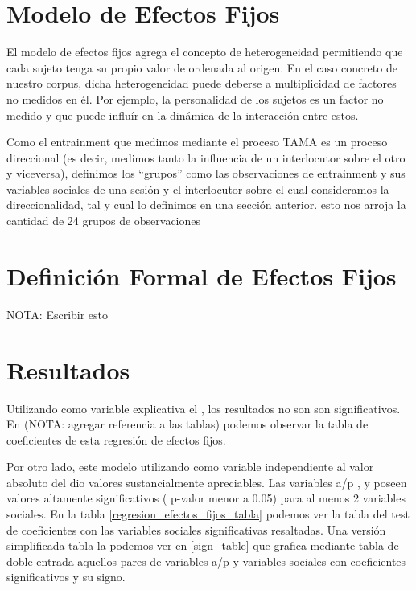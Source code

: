 \section{Modelo de Efectos Fijos}


\newcommand{\slopeestim}[1] { $\estslope \sim #1$ }

El modelo de efectos fijos agrega el concepto de heterogeneidad permitiendo que cada sujeto tenga su propio valor de ordenada al origen. En el caso concreto de nuestro corpus, dicha heterogeneidad puede deberse a multiplicidad de factores no medidos en él. Por ejemplo, la personalidad de los sujetos es un factor no medido y que puede influír en la dinámica de la interacción entre estos.

Como el entrainment que medimos mediante el proceso TAMA es un proceso direccional (es decir, medimos tanto la influencia de un interlocutor sobre el otro y viceversa), definimos los ``grupos'' como las observaciones de entrainment y sus variables sociales de una sesión y el interlocutor sobre el cual consideramos la direccionalidad, tal y cual lo definimos en una sección anterior. esto nos arroja la cantidad de 24 grupos de observaciones



\section{Definición Formal de Efectos Fijos}

NOTA: Escribir esto

\section{Resultados}

Utilizando como variable explicativa el \entrainment, los resultados no son son significativos. En (NOTA: agregar referencia a las tablas) podemos observar la tabla de coeficientes de esta regresión de efectos fijos.

Por otro lado, este modelo utilizando como variable independiente al valor absoluto del \entrainment dio valores sustancialmente apreciables. Las variables a/p \ENGMAX, \FOMEAN y \NOISETOHARMONICS poseen valores altamente significativos ( p-valor menor a 0.05) para al menos 2 variables sociales. En la tabla \ref{regresion_efectos_fijos_tabla} podemos ver la tabla del test de coeficientes con las variables sociales significativas resaltadas. Una versión simplificada tabla la podemos ver en \ref{sign_table} que grafica mediante tabla de doble entrada aquellos pares de variables a/p y variables sociales con coeficientes significativos y su signo.

